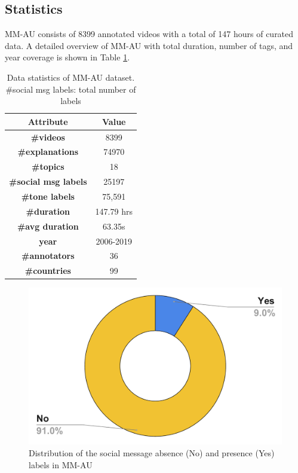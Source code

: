 \subsection{Statistics}
MM-AU consists of 8399 annotated videos with a total of 147 hours of curated data. A detailed overview of MM-AU with total duration, number of tags, and year coverage is shown in Table \ref{Data_stats_table}.
\begin{table}[h!]
\centering
\begin{tabular}{@{}cc@{}}
\toprule
\textbf{Attribute} & \textbf{Value} \\ \midrule
\textbf{\#videos}           & 8399           \\
\textbf{\#explanations}     & 74970         \\
\textbf{\#topics}           & 18          \\
\textbf{\#social msg labels}       & 25197          \\
\textbf{\#tone labels}           & 75,591         \\
\textbf{\#duration}         & 147.79 hrs     \\
\textbf{\#avg duration}     & 63.35s         \\
\textbf{year}               & 2006-2019      \\
\textbf{\#annotators}       & 36             \\ 
\textbf{\#countries}       & 99             \\ \bottomrule
\end{tabular}
\caption{Data statistics of MM-AU dataset. \#social msg labels: total number of labels }
\label{Data_stats_table}
\end{table}
\begin{figure}[h!]
    \centering
    \includegraphics[width=0.6\columnwidth]{figures/social_message_majority.pdf}
    \caption{Distribution of the social message absence (No) and presence (Yes) labels in MM-AU}
    \label{Social_message_majority}
\end{figure}
